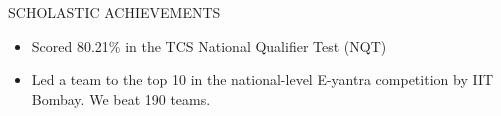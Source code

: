 \documentclass{resume} %
\begin{document}





\begin{rSection}{SCHOLASTIC ACHIEVEMENTS}
\begin{itemize}
\item Scored 80.21\% in the TCS National Qualifier Test (NQT)
\item Led a team to the top 10 in the national-level E-yantra competition by IIT Bombay. We beat 190 teams.
\end{itemize}
\end{rSection} 

\end{document}
